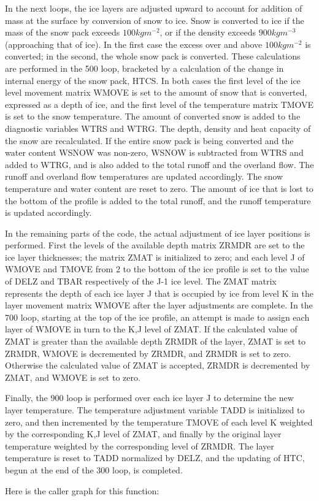 In the next loops, the ice layers are adjusted upward to account for addition of mass at the surface by conversion of snow to ice. Snow is converted to ice if the mass of the snow pack exceeds $100 kg m^{-2}$, or if the density exceeds $900 kg m^{-3}$ (approaching that of ice). In the first case the excess over and above $100 kg m^{-2}$ is converted; in the second, the whole snow pack is converted. These calculations are performed in the 500 loop, bracketed by a calculation of the change in internal energy of the snow pack, H\+T\+C\+S. In both cases the first level of the ice level movement matrix W\+M\+O\+V\+E is set to the amount of snow that is converted, expressed as a depth of ice, and the first level of the temperature matrix T\+M\+O\+V\+E is set to the snow temperature. The amount of converted snow is added to the diagnostic variables W\+T\+R\+S and W\+T\+R\+G. The depth, density and heat capacity of the snow are recalculated. If the entire snow pack is being converted and the water content W\+S\+N\+O\+W was non-\/zero, W\+S\+N\+O\+W is subtracted from W\+T\+R\+S and added to W\+T\+R\+G, and is also added to the total runoff and the overland flow. The runoff and overland flow temperatures are updated accordingly. The snow temperature and water content are reset to zero. The amount of ice that is lost to the bottom of the profile is added to the total runoff, and the runoff temperature is updated accordingly.

In the remaining parts of the code, the actual adjustment of ice layer positions is performed. First the levels of the available depth matrix Z\+R\+M\+D\+R are set to the ice layer thicknesses; the matrix Z\+M\+A\+T is initialized to zero; and each level J of W\+M\+O\+V\+E and T\+M\+O\+V\+E from 2 to the bottom of the ice profile is set to the value of D\+E\+L\+Z and T\+B\+A\+R respectively of the J-\/1 ice level. The Z\+M\+A\+T matrix represents the depth of each ice layer J that is occupied by ice from level K in the layer movement matrix W\+M\+O\+V\+E after the layer adjustments are complete. In the 700 loop, starting at the top of the ice profile, an attempt is made to assign each layer of W\+M\+O\+V\+E in turn to the K,J level of Z\+M\+A\+T. If the calculated value of Z\+M\+A\+T is greater than the available depth Z\+R\+M\+D\+R of the layer, Z\+M\+A\+T is set to Z\+R\+M\+D\+R, W\+M\+O\+V\+E is decremented by Z\+R\+M\+D\+R, and Z\+R\+M\+D\+R is set to zero. Otherwise the calculated value of Z\+M\+A\+T is accepted, Z\+R\+M\+D\+R is decremented by Z\+M\+A\+T, and W\+M\+O\+V\+E is set to zero.

Finally, the 900 loop is performed over each ice layer J to determine the new layer temperature. The temperature adjustment variable T\+A\+D\+D is initialized to zero, and then incremented by the temperature T\+M\+O\+V\+E of each level K weighted by the corresponding K,J level of Z\+M\+A\+T, and finally by the original layer temperature weighted by the corresponding level of Z\+R\+M\+D\+R. The layer temperature is reset to T\+A\+D\+D normalized by D\+E\+L\+Z, and the updating of H\+T\+C, begun at the end of the 300 loop, is completed.

Here is the caller graph for this function\+:


